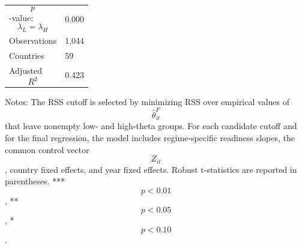 \begin{table}[H]
\begin{threeparttable}
\begin{tabularx}{\textwidth}{lY}
$$p$$-value: $$\lambda_L=\lambda_H$$ & 0.000 \\
Observations & 1,044 \\
Countries & 59 \\
Adjusted $$R^2$$ & 0.423 \\
\bottomrule
\end{tabularx}
\begin{tablenotes}[flushleft]\footnotesize
\item Notes: The RSS cutoff is selected by minimizing RSS over empirical values of $$\widehat{\theta}^{F}_{it}$$ that leave nonempty low- and high-theta groups. For each candidate cutoff and for the final regression, the model includes regime-specific readiness slopes, the common control vector $$Z_{it}$$, country fixed effects, and year fixed effects. Robust t-statistics are reported in parentheses. *** $$p<0.01$$, ** $$p<0.05$$, * $$p<0.10$$.
\end{tablenotes}
\end{threeparttable}
\end{table}
